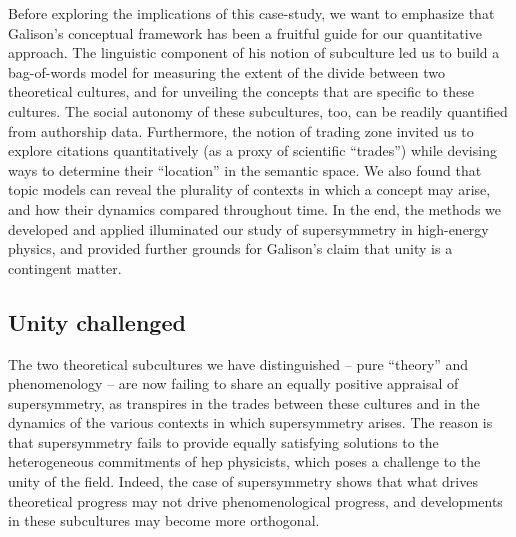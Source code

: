 \documentclass[smallextended]{svjour3}
\begin{document}
Before exploring the implications of this case-study, we want to emphasize that Galison's conceptual framework has been a fruitful guide for our quantitative approach. The linguistic component of his notion of subculture led us to build a bag-of-words model for measuring the extent of the divide between two theoretical cultures, and for unveiling the concepts that are specific to these cultures. The social autonomy of these subcultures, too, can be readily quantified from authorship data. Furthermore, the notion of trading zone invited us to explore citations quantitatively (as a proxy of scientific ``trades'') while devising ways to determine their ``location'' in the semantic space. We also found that topic models can reveal the plurality of contexts in which a concept may arise, and how their dynamics compared throughout time. In the end, the methods we developed and applied illuminated our study of supersymmetry in high-energy physics, and provided further grounds for Galison's claim that unity is a contingent matter. 


\subsection{Unity challenged}

The two theoretical subcultures we have distinguished -- pure ``theory'' and phenomenology -- are now failing to share an equally positive appraisal of supersymmetry, as transpires in the trades between these cultures and in the dynamics of the various contexts in which supersymmetry arises. The reason is that supersymmetry fails to provide equally satisfying solutions to the heterogeneous commitments of \gls{hep} physicists, which poses a challenge to the unity of the field. Indeed, the case of supersymmetry shows that what drives theoretical progress may not drive phenomenological progress, and developments in these subcultures may become more orthogonal.
\end{document}
